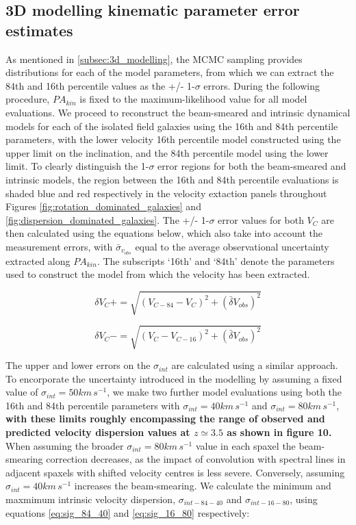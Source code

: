 \documentclass[fleqn,usenatbib]{mnras}
\begin{document}
\subsection{3D modelling kinematic parameter error estimates}\label{appsubsec:model_errors}
As mentioned in \cref{subsec:3d_modelling}, the MCMC sampling provides distributions for each of the model parameters, from which we can extract the 84th and 16th percentile values as the +/- 1-$\sigma$ errors.
During the following procedure, $PA_{kin}$ is fixed to the maximum-likelihood value for all model evaluations.
We proceed to reconstruct the beam-smeared and intrinsic dynamical models for each of the isolated field galaxies using the 16th and 84th percentile parameters, with the lower velocity 16th percentile model constructed using the upper limit on the inclination, and the 84th percentile model using the lower limit.
To clearly distinguish the 1-$\sigma$ error regions for both the beam-smeared and intrinsic models, the region between the 16th and 84th percentile evaluations is shaded blue and red respectively in the velocity extaction panels throughout Figures \ref{fig:rotation_dominated_galaxies} and \ref{fig:dispersion_dominated_galaxies}.
The +/- 1-$\sigma$ error values for both $V_{C}$ are then calculated using the equations below, which also take into account the measurement errors, with $\bar{\sigma}_{v_{obs}}$ equal to the average observational uncertainty extracted along $PA_{kin}$.
The subscripts `16th' and `84th' denote the parameters used to construct the model from which the velocity has been extracted.


\begin{equation}\label{eq:VC_plus}
   \delta V_{C}+ = \sqrt{\left(V_{C-84} - V_{C}\right)^{2} + \left(\bar{\delta}V_{obs}\right)^{2}}
\end{equation}

\begin{equation}\label{eq:VC_minus}
   \delta V_{C}- = \sqrt{\left(V_{C} - V_{C-16}\right)^{2}  + \left(\bar{\delta}V_{obs}\right)^{2}}
\end{equation}


The upper and lower errors on the $\sigma_{int}$ are calculated using a similar approach.
To encorporate the uncertainty introduced in the modelling by assuming a fixed value of $\sigma_{int}=50 km\,s^{-1}$, we make two further model evaluations using both the 16th and 84th percentile parameters with $\sigma_{int} = 40 km\,s^{-1}$ and $\sigma_{int} = 80 km\,s^{-1}$, \textbf{with these limits roughly encompassing the range of observed and predicted velocity dispersion values at $z\simeq3.5$ as shown in \cite{Wisnioski2015} figure 10.}
When assuming the broader $\sigma_{int} = 80 km\,s^{-1}$ value in each spaxel the beam-smearing correction decreases, as the impact of convolution with spectral lines in adjacent spaxels with shifted velocity centres is less severe.
Conversely, assuming $\sigma_{int} = 40 km\,s^{-1}$ increases the beam-smearing.
We calculate the minimum and maxmimum intrinsic velocity dispersion, $\sigma_{int-84-40}$ and $\sigma_{int-16-80}$, using equations \ref{eq:sig_84_40} and \ref{eq:sig_16_80} respectively:
\end{document}
